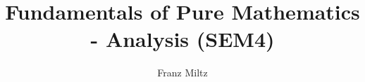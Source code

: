 \documentclass{article}
\begin{document}
\mkfpmthms
\title{Fundamentals of Pure Mathematics - Analysis (SEM4)}
\author{Franz Miltz}
\maketitle
\tableofcontents
\pagebreak
\end{document}
